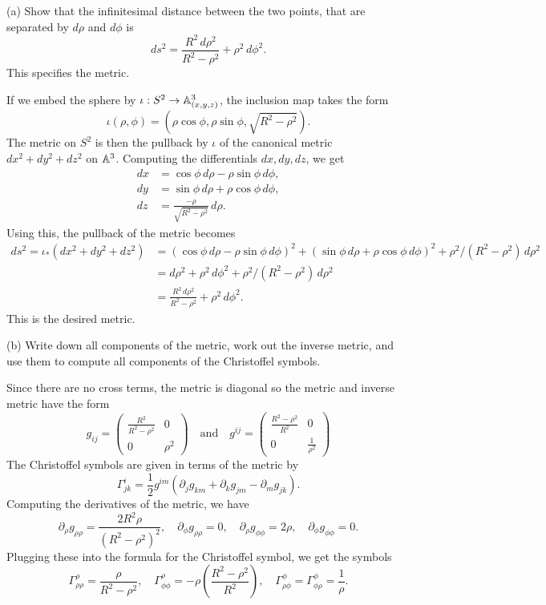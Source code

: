 \documentclass{../../templates/lkx_pset}
\begin{document}
\begin{parts}
	\begin{part}{(a)}
		Show that the infinitesimal distance between the two points, that are separated by $d\rho$ and $d\phi$ is
		\[
			ds^2 = \frac{R^2\,d\rho^2}{R^2-\rho^2} + \rho^2\,d\phi^2.
		\]
		This specifies the metric.
	\end{part}

	If we embed the sphere by $\iota : S^2 \to \mathbb{A}^3_{(x,y,z)}$, the inclusion map takes the form
	\[
		\iota(\rho, \phi) = \left(\rho\cos \phi, \rho\sin \phi, \sqrt{R^2 - \rho^2}\right).
	\]
	The metric on $S^2$ is then the pullback by $\iota$ of the canonical metric $dx^2+dy^2+dz^2$ on $\mathbb{A}^3$. Computing the differentials $dx,dy,dz$, we get
	\[
		\begin{aligned}
			dx & = \cos\phi\,d\rho-\rho\sin\phi\,d\phi,    \\
			dy & = \sin\phi\,d\rho + \rho\cos\phi\,d\phi,  \\
			dz & = \frac{-\rho}{\sqrt{R^2-\rho^2}}\,d\rho.
		\end{aligned}
	\]
	Using this, the pullback of the metric becomes
	\[
		\begin{aligned}
			ds^2 = \iota_*(dx^2+dy^2+dz^2)
			 & = (\cos\phi\,d\rho - \rho \sin\phi\,d\phi)^2 + (\sin\phi\,d\rho + \rho\cos\phi\,d\phi)^2 + \rho^2/(R^2-\rho^2)\,d\rho^2 \\
			 & = d\rho^2 + \rho^2\,d\phi^2 + \rho^2/(R^2-\rho^2)\,d\rho^2                                                              \\
			 & = \frac{R^2\,d\rho^2}{R^2-\rho^2} + \rho^2\,d\phi^2.
		\end{aligned}
	\]
	This is the desired metric.

	\begin{part}{(b)}
		Write down all components of the metric, work out the inverse metric, and use them to compute all components of the Christoffel symbols.
	\end{part}

	Since there are no cross terms, the metric is diagonal so the metric and inverse metric have the form
	\[
		g_{ij} = \begin{pmatrix}\frac{R^2}{R^2-\rho^2}&0\\ 0 &\rho^2\end{pmatrix}
		\quad\textrm{and}\quad
		g^{ij} = \begin{pmatrix}\frac{R^2-\rho^2}{R^2}&0\\ 0 &\frac{1}{\rho^2}\end{pmatrix}
	\]
	The Christoffel symbols are given in terms of the metric by
	\[
		\Gamma^i_{j k} = \frac{1}{2} g^{im}(\partial_j g_{km} + \partial_k g_{jm} - \partial_m g_{j k}).
	\]
	Computing the derivatives of the metric, we have
	\[
		\partial_\rho g_{\rho\rho} = \frac{2R^2\rho}{(R^2-\rho^2)^2},\quad\partial_\phi g_{\rho\rho}=0,\quad \partial_\rho g_{\phi\phi} = 2\rho, \quad \partial_\phi g_{\phi\phi} = 0.
	\]
	Plugging these into the formula for the Christoffel symbol, we get the symbols
	\[
		\Gamma^\rho_{\rho\rho} = \frac{\rho}{R^2-\rho^2},\quad \Gamma^\rho_{\phi\phi} = -\rho\left(\frac{R^2-\rho^2}{R^2}\right),\quad \Gamma^\phi_{\rho\phi} = \Gamma^\phi_{\phi\rho}=\frac{1}{\rho}.
	\]


\end{parts}
\end{document}

